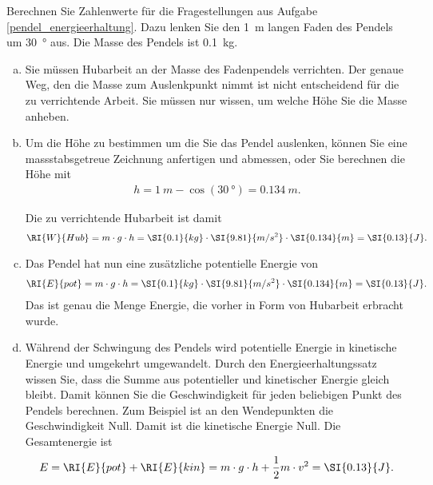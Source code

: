 \begin{aufgabe}
	Berechnen Sie Zahlenwerte für die Fragestellungen aus Aufgabe \ref{pendel_energieerhaltung}.
	Dazu lenken Sie den \SI{1}{m} langen Faden des Pendels um \SI{30}{\degree} aus.
	Die Masse des Pendels ist \SI{0.1}{kg}.

	\begin{loesung}
		\begin{enumerate}[a)]
			\item Sie müssen Hubarbeit an der Masse des Fadenpendels verrichten. 
				Der genaue Weg, den die Masse zum Auslenkpunkt nimmt ist nicht entscheidend für die zu verrichtende Arbeit.
				Sie müssen nur wissen, um welche Höhe Sie die Masse anheben.
			\item Um die Höhe zu bestimmen um die Sie das Pendel auslenken, können Sie eine massstabsgetreue Zeichnung anfertigen und abmessen,
				oder Sie berechnen die Höhe mit
				\begin{eqnarray*}
					h=\SI{1}{m} - \cos(\SI{30}{\degree}) = \SI{0.134}{m}\text{.}
				\end{eqnarray*}

				Die zu verrichtende Hubarbeit ist damit
				\begin{eqnarray*}
					\RI{W}{Hub} = m\cdot g\cdot h =\SI{0.1}{kg}\cdot\SI{9.81}{m/s^2}\cdot\SI{0.134}{m} =\SI{0.13}{J}\text{.}
				\end{eqnarray*}
			\item Das Pendel hat nun eine zusätzliche potentielle Energie von
				\begin{eqnarray*}
					\RI{E}{pot} = m\cdot g\cdot h =\SI{0.1}{kg}\cdot\SI{9.81}{m/s^2}\cdot\SI{0.134}{m} =\SI{0.13}{J}\text{.}
				\end{eqnarray*}
				Das ist genau die Menge Energie, die vorher in Form von Hubarbeit erbracht wurde.
			\item Während der Schwingung des Pendels wird potentielle Energie in kinetische Energie und umgekehrt umgewandelt.
				Durch den Energieerhaltungssatz wissen Sie, dass die Summe aus potentieller und kinetischer Energie gleich
				bleibt. Damit können Sie die Geschwindigkeit für jeden beliebigen Punkt des Pendels berechnen.
				Zum Beispiel ist an den Wendepunkten die Geschwindigkeit Null. Damit ist die kinetische Energie Null. Die Gesamtenergie ist
				\begin{eqnarray*}
					E =\RI{E}{pot} + \RI{E}{kin} = m\cdot g\cdot h + \frac{1}{2} m\cdot v^2 = \SI{0.13}{J}\text{.} 
				\end{eqnarray*}


\end{enumerate}
\end{loesung}
\end{aufgabe}
